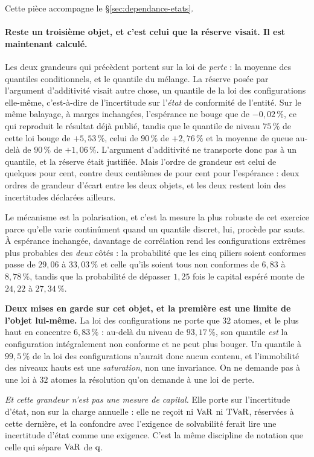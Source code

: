 
Cette pièce accompagne le \S\ref{sec:dependance-etats}.

\paragraph{Reste un troisième objet, et c'est celui que la réserve visait. Il est maintenant
calculé.} Les deux grandeurs qui précèdent portent sur la loi de \emph{perte} : la moyenne des
quantiles conditionnels, et le quantile du mélange. La réserve posée par l'argument d'additivité
visait autre chose, un quantile de la loi des configurations elle-même, c'est-à-dire de
l'incertitude sur l'\emph{état} de conformité de l'entité. Sur le même balayage, à marges
inchangées, l'espérance ne bouge que de $-0{,}02\,\%$, ce qui reproduit le résultat déjà publié,
tandis que le quantile de niveau $75\,\%$ de cette loi bouge de $+5{,}53\,\%$, celui de $90\,\%$
de $+2{,}76\,\%$ et la moyenne de queue au-delà de $90\,\%$ de $+1{,}06\,\%$. L'argument
d'additivité ne transporte donc pas à un quantile, et la réserve était justifiée. Mais l'ordre
de grandeur est celui de quelques pour cent, contre deux centièmes de pour cent pour l'espérance :
deux ordres de grandeur d'écart entre les deux objets, et les deux restent loin des incertitudes
déclarées ailleurs.

Le mécanisme est la polarisation, et c'est la mesure la plus robuste de cet exercice
parce qu'elle varie continûment quand un quantile discret, lui, procède par sauts. À espérance
inchangée, davantage de corrélation rend les configurations extrêmes plus probables des
\emph{deux} côtés : la probabilité que les cinq piliers soient conformes passe de $29{,}06$ à
$33{,}03\,\%$ et celle qu'ils soient tous non conformes de $6{,}83$ à $8{,}78\,\%$, tandis que la
probabilité de dépasser $1{,}25$ fois le capital espéré monte de $24{,}22$ à $27{,}34\,\%$.

\begin{attention}
\textbf{Deux mises en garde sur cet objet, et la première est une limite de l'objet lui-même.}
La loi des configurations ne porte que $32$ atomes, et le plus haut en concentre $6{,}83\,\%$ :
au-delà du niveau de $93{,}17\,\%$, son quantile \emph{est} la configuration intégralement non
conforme et ne peut plus bouger. Un \og{}quantile à $99{,}5\,\%$ de la loi des
configurations\fg{} n'aurait donc aucun contenu, et l'immobilité des niveaux hauts est une
\emph{saturation}, non une invariance. On ne demande pas à une loi à $32$ atomes la résolution
qu'on demande à une loi de perte.

\emph{Et cette grandeur n'est pas une mesure de capital.} Elle porte sur l'incertitude d'état,
non sur la charge annuelle : elle ne reçoit ni $\mathrm{VaR}$ ni $\mathrm{TVaR}$, réservées à cette dernière, et
la confondre avec l'exigence de solvabilité ferait lire une incertitude d'état comme une
exigence. C'est la même discipline de notation que celle qui sépare $\mathrm{VaR}$ de $\mathrm{q}$.
\end{attention}

